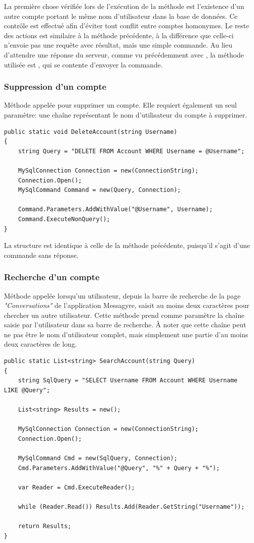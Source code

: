 \documentclass[12pt]{report}
\begin{document}
La première chose vérifiée lors de l’exécution de la méthode est l’existence d’un autre compte portant le même nom d’utilisateur dans la base de données. Ce contrôle est effectué afin d’éviter tout conflit entre comptes homonymes. Le reste des actions est similaire à la méthode précédente, à la différence que celle-ci n’envoie pas une requête avec résultat, mais une simple commande. Au lieu d’attendre une réponse du serveur, comme vu précédemment avec , la méthode utilisée est , qui se contente d’envoyer la commande.

\subsubsection{Suppression d’un compte}

Méthode appelée pour supprimer un compte. Elle requiert également un seul paramètre: une chaîne  représentant le nom d’utilisateur du compte à supprimer.

\begin{verbatim}
public static void DeleteAccount(string Username)
{
	string Query = "DELETE FROM Account WHERE Username = @Username";
	
	MySqlConnection Connection = new(ConnectionString);
	Connection.Open();
	MySqlCommand Command = new(Query, Connection);
	
	Command.Parameters.AddWithValue("@Username", Username);
	Command.ExecuteNonQuery();
}
\end{verbatim}

La structure est identique à celle de la méthode précédente, puisqu’il s’agit d’une commande sans réponse.

\subsubsection{Recherche d’un compte}

Méthode appelée lorsqu’un utilisateur, depuis la barre de recherche de la page \textit{"Conversations"} de l’application Messagyre, saisit au moins deux caractères pour chercher un autre utilisateur.  
Cette méthode prend comme paramètre la chaîne saisie par l’utilisateur dans sa barre de recherche. À noter que cette chaîne peut ne pas être le nom d’utilisateur complet, mais simplement une partie d’au moins deux caractères de long.

\begin{verbatim}
public static List<string> SearchAccount(string Query)
{
	string SqlQuery = "SELECT Username FROM Account WHERE Username LIKE @Query";
	
	List<string> Results = new();
	
	MySqlConnection Connection = new(ConnectionString);
	Connection.Open();
	
	MySqlCommand Cmd = new(SqlQuery, Connection);
	Cmd.Parameters.AddWithValue("@Query", "%" + Query + "%");
	
	var Reader = Cmd.ExecuteReader();
	
	while (Reader.Read()) Results.Add(Reader.GetString("Username"));
	
	return Results;
}
\end{verbatim}
\end{document}
